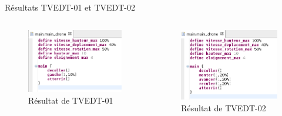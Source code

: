 \documentclass{bredelebeamer}
\begin{document}

\begin{frame}{Résultats TVEDT-01 et TVEDT-02} 
\begin{columns}
\begin{column}{0.5\textwidth}
\begin{figure}
\centering
\includegraphics[scale=0.45]{images/TVEDT-01.png}
\caption{Résultat de TVEDT-01}
\end{figure}
\end{column}
\begin{column}{0.5\textwidth}
\begin{figure}
\centering
\includegraphics[scale=0.4]{images/TVEDT-02.png}
\caption{Résultat de TVEDT-02}
\end{figure}
\end{column}
\end{columns}
\end{frame}
\end{document}
